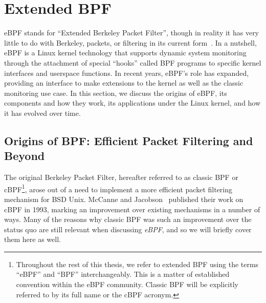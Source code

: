 \section{Extended BPF}%
\label{s:ebpf-bg}

eBPF stands for \enquote{Extended Berkeley Packet Filter}, though in reality it has very
little to do with Berkeley, packets, or filtering in its current
form~\cite{gregg2019_bpf}. In a nutshell, eBPF is a Linux kernel technology that supports
dynamic system monitoring through the attachment of special \enquote{hooks} called BPF
programs to specific kernel interfaces and userspace functions. In recent years, eBPF's
role has expanded, providing an interface to make extensions to the kernel as well as the
classic monitoring use case. In this section, we discuss the origins of eBPF, its
components and how they work, its applications under the Linux kernel, and how it has
evolved over time.


\subsection{Origins of BPF\@: Efficient Packet Filtering and Beyond}%
\label{ss:origins-of-bpf-bg}

The original Berkeley Packet Filter, hereafter referred to as classic BPF or
cBPF\footnote{Throughout the rest of this thesis, we refer to extended BPF using the terms
\enquote{eBPF} and \enquote{BPF} interchangeably. This is a matter of established
convention within the eBPF community. Classic BPF will be explicitly referred to by its
full name or the cBPF acronym.}, arose out of a need to implement a more efficient packet
filtering mechanism for BSD Unix.  McCanne and Jacobson~\cite{mccanne1993_bpf} published
their work on cBPF in 1993, marking an improvement over existing mechanisms in a number of
ways. Many of the reasons why classic BPF was such an improvement over the status quo are
still relevant when discussing \textit{eBPF}, and so we will briefly cover them here as
well.

